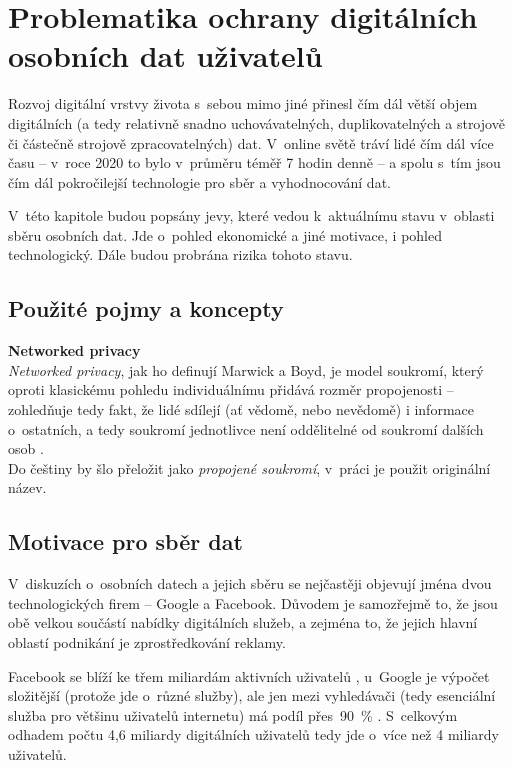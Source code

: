 \chapter{Problematika ochrany digitálních\\ osobních dat uživatelů}

Rozvoj digitální vrstvy života s~sebou mimo jiné přinesl čím dál větší objem digitálních (a tedy relativně snadno uchovávatelných, duplikovatelných a strojově či částečně strojově zpracovatelných) dat. V~online světě tráví lidé čím dál více času -- v~roce 2020 to bylo v~průměru téměř 7 hodin denně \citep{digital-2021-report} -- a spolu s~tím jsou čím dál pokročilejší technologie pro sběr a vyhodnocování dat.

V~této kapitole budou popsány jevy, které vedou k~aktuálnímu stavu v~oblasti sběru osobních dat.
Jde o~pohled ekonomické a jiné motivace, i pohled technologický.
Dále budou probrána rizika tohoto stavu.

\section*{Použité pojmy a koncepty}

\textbf{Networked privacy}\\
\textit{Networked privacy}, jak ho definují Marwick a Boyd, je model soukromí, který oproti klasickému pohledu individuálnímu přidává rozměr propojenosti -- zohledňuje tedy fakt, že lidé sdílejí (ať vědomě, nebo nevědomě) i informace o~ostatních, a tedy soukromí jednotlivce není oddělitelné od soukromí dalších osob \citep{networked-privacy}.\\
Do češtiny by šlo přeložit jako \textit{propojené soukromí}, v~práci je použit originální název.

\section{Motivace pro sběr dat}

V~diskuzích o~osobních datech a jejich sběru se nejčastěji objevují jména dvou technologických firem -- Google a Facebook. Důvodem je samozřejmě to, že jsou obě velkou součástí nabídky digitálních služeb, a zejména to, že jejich hlavní oblastí podnikání je zprostředkování reklamy.

Facebook se blíží ke třem miliardám aktivních uživatelů \citep{facebook-active-users}, u~Google je výpočet složitější (protože jde o~různé služby), ale jen mezi vyhledávači (tedy esenciální služba pro většinu uživatelů internetu) má podíl přes~90~\% \citep{google-search}. S~celkovým odhadem počtu 4,6 miliardy digitálních uživatelů \citep{digital-2021-report} tedy jde o~více než 4 miliardy uživatelů.

